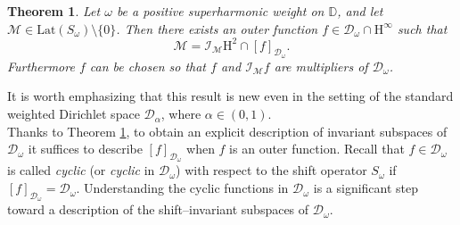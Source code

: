 \documentclass[12pt,reqno,a4paper]{amsart}
\newtheorem{theor}{Theorem }
\newcommand{\Lat}{\mathrm{Lat}}
\newcommand{\cM}{{\mathcal{M}}}
\newcommand{\kH}{\mathrm{H^\infty  }}
\newcommand{\hH}{\mathrm{H^2 }}
\newcommand\TT{\mathbb{T}}
\newcommand\DD{\mathbb{D}}
\newcommand{\cZ}{{\mathcal{Z}}}
\newcommand{\cD}{{\mathcal{D}}}
\numberwithin{equation}{section}
\begin{document}
\begin{theor}\label{RSinvar}  Let $\omega$ be a positive superharmonic weight on $\DD$, and   let $\cM\in \Lat(S_\omega)\setminus\{0\}$. %
	Then there exists an outer function  $f\in   \cD_\omega\cap \kH$ such that 
	\[
	\cM=\mathcal{I}_\cM \hH\cap [f]_{  \cD_\omega}.
	\]
	Furthermore $f$ can be chosen so that $f$ and $\mathcal{I}_\cM f$ are multipliers of $\cD_\omega$.
\end{theor}
It is worth emphasizing that this result is new even in the setting of the standard weighted Dirichlet space \(\cD_\alpha\), where \(\alpha \in (0,1)\).\\


Thanks to Theorem \ref{RSinvar}, to obtain an explicit description of invariant subspaces of $\cD_\omega$ it suffices to describe  $[f]_{  \cD_\omega}$ when $f$ is an outer function.
%
%   
Recall that  \( f \in \cD_\omega \) is called \textit{cyclic} (or \textit{cyclic} in \(\cD_\omega\)) with respect to the shift operator \( S_\omega \) if \( [f]_{\cD_\omega} = \cD_\omega \). Understanding the cyclic functions in \(\cD_\omega\) is a significant step toward a description of the shift--invariant subspaces of \(\cD_\omega\). 

\end{document}
